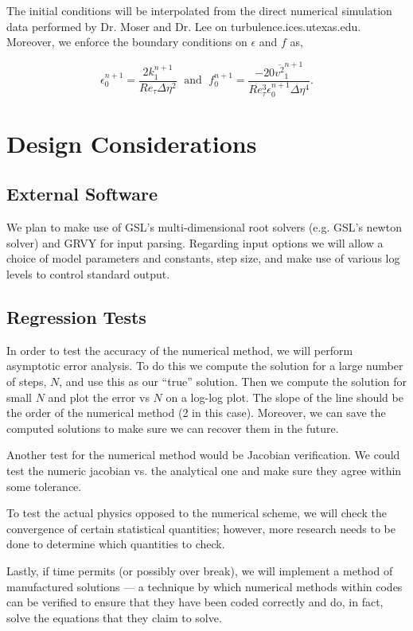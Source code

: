 \documentclass[12pt]{article}
\newcommand{\ep}{\epsilon} \newcommand{\noi}{\noindent}
\begin{document}
\noi The initial conditions will be interpolated from the direct numerical
simulation data performed by Dr. Moser and Dr. Lee on
turbulence.ices.utexas.edu. Moreover, we enforce the boundary conditions on
$\ep$ and $f$ as, 

\[ \ep_0^{n+1} = \frac{2k_1^{n+1}}{Re_\tau \Delta \eta^2} \; \text{ and } \;
f_0^{n+1} = \frac{-20 \overline{v^2}_1^{n+1}}{Re_\tau^3 \ep_0^{n+1} \Delta
\eta^4} . \] 

\section{Design Considerations}

\subsection{External Software}

We plan to make use of GSL's multi-dimensional root solvers (e.g. GSL's newton
solver) and GRVY for input parsing. Regarding input options we will allow a
choice of model parameters and constants, step size, and make use of various log
levels to control standard output.  

\subsection{Regression Tests}

In order to test the accuracy of the numerical method, we will perform
asymptotic error analysis. To do this we compute the solution for a large number
of steps, $N$, and use this as our ``true'' solution. Then we compute the
solution for small $N$ and plot the error vs $N$ on a log-log plot. The slope of
the line should be the order of the numerical method (2 in this case). Moreover, we
can save the computed solutions to make sure we can recover them in the future. 

Another test for the numerical method would be Jacobian verification. We
could test the numeric jacobian vs. the analytical one and make sure they agree
within some tolerance. 

To test the actual physics opposed to the numerical scheme, we will check the
convergence of certain statistical quantities; however, more research needs to be done
to determine which quantities to check. 

Lastly, if time permits (or possibly over break), we will implement a method of manufactured
solutions ---  a technique by which numerical methods within codes can be verified
to ensure that they have been coded correctly and do, in fact, solve the
equations that they claim to solve.
\end{document}
